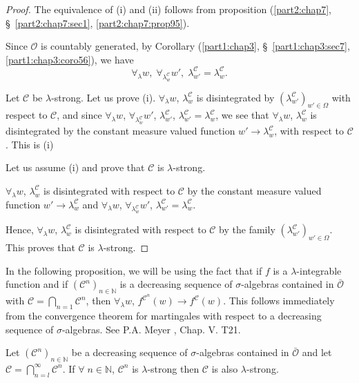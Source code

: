 \begin{proof}
The equivalence of (i) and (ii) follows from proposition
(\ref{part2:chap7}, \S\ \ref{part2:chap7:sec1},
\ref{part2:chap7:prop95}). 

Since $\mathscr{O}$ is countably generated, by Corollary
(\ref{part1:chap3}, \S\ \ref{part1:chap3:sec7}, \ref{part1:chap3:coro56}), we have 
$$
\forall_\lambda w, \; \forall_{\lambda^\mathscr{C}_w} w', \;
\lambda^\mathscr{C}_{w'} = \lambda^\mathscr{C}_w. 
$$

Let $\mathscr{C}$ be $\lambda$-strong. Let us prove
(i). $\forall_\lambda w$, $\lambda^\mathscr{C}_w$ is disintegrated by
$(\lambda^\mathscr{C}_{w'})_{w' \in \Omega}$ with respect to
$\mathscr{C}$, and since $\forall_\lambda w$,
$\forall_{\lambda^\mathscr{C}_w} w'$, $\lambda^\mathscr{C}_{w'}$,
$\lambda^\mathscr{C}_{w' } = \lambda^\mathscr{C}_w$, we see that
$\forall_\lambda w$, $\lambda^\mathscr{C}_w$ is disintegrated by the
constant measure valued function $ w' \to \lambda^\mathscr{C}_{w}$,
with respect to $\mathscr{C}$. This is (i)

Let us assume (i) and prove that $\mathscr{C}$ is $\lambda$-strong. 

$\forall_\lambda w$, $\lambda^\mathscr{C}_w$ is disintegrated with
respect to $\mathscr{C}$ by the constant measure valued function $w'
\to \lambda^\mathscr{C}_w$ and $\forall_\lambda w$,
$\forall_{\lambda^\mathscr{C}_w} w'$, $\lambda^\mathscr{C}_{w'} =
\lambda^\mathscr{C}_w$. 

Hence, $\forall_\lambda w$, $\lambda^\mathscr{C}_w$ is disintegrated
with respect to $\mathscr{C}$ by the family
$(\lambda^\mathscr{C}_{w'})_{w' \in\Omega}$. This proves that
$\mathscr{C}$ is $\lambda$-strong.
\end{proof}

In the following proposition, we will be using the fact that if $f$ is
a $\lambda$-integrable function and if $(\mathscr{C}^n)_{n \in
  \mathbb{N}}$ is a decreasing sequence of $\sigma$-algebras contained
in $\bar{\mathscr{O}}$ with $\mathscr{C} = \bigcap\limits_{n=1}
\mathscr{C}^n$, then $\forall_\lambda w$, $f^{\mathscr{C}^n}(w) \to
f^{\mathscr{C}}(w)$. This follows immediately from the convergence
theorem for martingales with respect to a decreasing sequence of
$\sigma$-algebras. See P.A. Meyer \cite{key1}, Chap. V. T21. 

\begin{proposition}\label{part2:chap7:prop103}
Let $(\mathscr{C}^n)_{n \in \mathbb{N}}$ be a decreasing sequence of
$\sigma$-algebras contained in $\bar{\mathscr{O}}$ and let
$\mathscr{C} = \bigcap\limits_{n=l}^\infty \mathscr{C}^n$. If $\forall
\; n \in \mathbb{N}$, $\mathscr{C}^n$ is $\lambda$-strong then
$\mathscr{C}$ is also $\lambda$-strong. 
\end{proposition}


